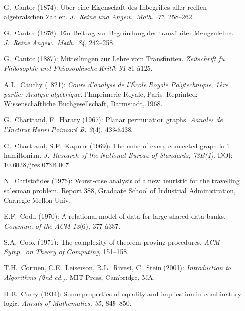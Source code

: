 \begin{thebibliography}{999}


G.~Cantor (1874): \"{U}ber eine Eigenschaft des Inbegriffes aller
reellen algebraischen Zahlen.  {\it J.~Reine und Angew.~Math.~77},
258--262.

G.~Cantor (1878): Ein Beitrag zur Begr\"{u}ndung der transfiniter
Mengenlehre.  {\it J.~Reine Angew.~Math.~84}, 242--258.

G.~Cantor (1887): Mitteilungen zur Lehre vom Transfiniten.
{\it Zeitschrift f\"{u} Philosophie und Philosophische Kritik 91}
81-â125.

A.L.~Cauchy (1821): {\it Cours d'analyse de l'\'{E}cole Royale
Polytechnique, 1\`{e}re partie: Analyse alg\'{e}brique.}
l'Imprimerie Royale, Paris.  Reprinted: Wissenschaftliche
Buchgesellschaft, Darmstadt, 1968.

G.~Chartrand, F.~Harary (1967):
Planar permutation graphs.
{\it Annales de l'Institut Henri Poincar\'{e} B, 3}(4), 433-â438.

G.~Chartrand, S.F.~Kapoor (1969):
The cube of every connected graph is 1-hamiltonian.
{\it J.~Research of the National Bureau of Standards, 73B(1)}.  DOI:
10.6028/jres.073B.007


N.~Christofides (1976):
Worst-case analysis of a new heuristic for the travelling salesman
problem.  Report 388, Graduate School of Industrial Administration,
Carnegie-Mellon Univ.

E.F.~Codd (1970):
A relational model of data for large shared data banks.
{\it Commun. of the ACM 13}(6), 377-â387.

S.A.~Cook (1971): The complexity of theorem-proving procedures.  {\it
  ACM Symp.~on Theory of Computing}, 151--158.

T.H.~Cormen, C.E.~Leiserson, R.L.~Rivest, C.~Stein (2001):
{\it Introduction to Algorithms (2nd ed.)}.
MIT Press, Cambridge, MA.

H.B.~Curry (1934): Some properties of equality and implication in
combinatory logic.  {\it Annals of Mathematics, 35}, 849--850.


\end{thebibliography}
